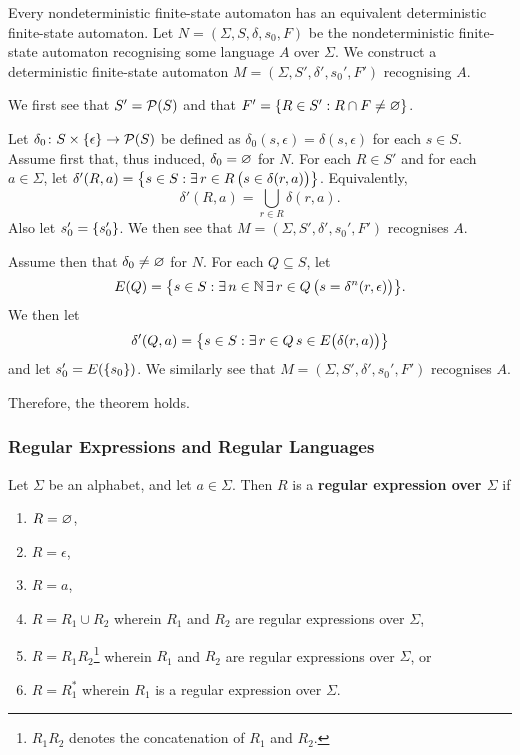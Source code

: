 \Bth
    \label{thm1}
    Every nondeterministic finite-state automaton has an equivalent
    deterministic finite-state automaton.
\Eth
\Bpr
    Let \(N = (\Sigma, S, \delta, s_0, F)\) be the nondeterministic finite-state
    automaton recognising some language \(A\) over \(\Sigma\).  We construct a
    deterministic finite-state automaton \(M = (\Sigma, S', \delta', s_0', F')\)
    recognising \(A\).

    We first see that \(S' = \pow(S)\) and that \(F' = \set{R \in S' : R \cap F
    \neq \nset}\).

    Let \(\map{\delta_0}{S \times \set{\epsilon}}{\pow(S)}\) be defined as
    \(\delta_0(s, \epsilon) = \delta(s, \epsilon)\) for each \(s \in S\). Assume
    first that, thus induced, \(\delta_0 = \nset\) for \(N\). For each \(R \in
    S'\) and for each \(a \in \Sigma\), let \(\delta'(R, a) = \set*{s \in S :
    \exists \, r \in R \, \big(s \in \delta(r, a)\big)}\). Equivalently,
    \[
        \delta'(R, a) = \bigcup_{r \in R} \delta(r, a).
    \]
    Also let \(s_0' = \set{s_0'}\). We then see that \(M = (\Sigma, S', \delta',
    s_0', F')\) recognises \(A\).

    Assume then that \(\delta_0 \neq \nset\) for \(N\). For each \(Q \subseteq S
    \), let
    \[
        E(Q) = \set*{s \in S : \exists \, n \in \setnat \, \exists \, r \in Q \,
        \big(s = \delta^n(r, \epsilon)\big)}.
    \]
    We then let
    \[
        \delta'(Q, a) = \set*{s \in S : \exists \, r \in Q \, s \in
        E\big(\delta(r, a)\big)}
    \]
    and let \(s_0' = E(\set{s_0})\). We similarly see that \(M = (\Sigma, S',
    \delta', s_0', F')\) recognises \(A\).

    Therefore, the theorem holds.
\Epr

\subsubsection{Regular Expressions and Regular Languages}

\Bdf
    Let \(\Sigma\) be an alphabet, and let \(a \in \Sigma\). Then \(R\) is a
    {\bf regular expression over \(\Sigma\)} if
    \begin{enumerate}
        \item \(R = \nset\),
        \item \(R = \epsilon\),
        \item \(R = a\),
        \item \(R = R_1 \cup R_2\) wherein \(R_1\) and \(R_2\) are regular
        expressions over \(\Sigma\),
        \item \(R = R_1 R_2\)\footnote{\(R_1 R_2\) denotes the concatenation of
        \(R_1\) and \(R_2\).} wherein \(R_1\) and \(R_2\) are regular
        expressions over \(\Sigma\), or
        \item \(R = R_1^*\) wherein \(R_1\) is a regular expression over
        \(\Sigma\).
    \end{enumerate}
\Edf

